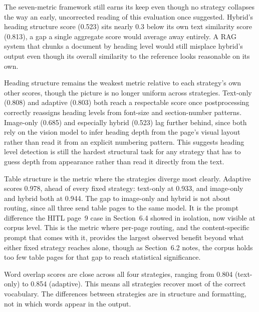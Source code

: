 The seven-metric framework still earns its keep even though no strategy
collapses the way an early, uncorrected reading of this evaluation once
suggested. Hybrid's heading structure score (0.523) sits nearly 0.3 below
its own text similarity score (0.813), a gap a single aggregate score would
average away entirely. A RAG system that chunks a document by heading level
would still misplace hybrid's output even though its overall similarity to
the reference looks reasonable on its own.

Heading structure remains the weakest metric relative to each strategy's
own other scores, though the picture is no longer uniform across
strategies. Text-only (0.808) and adaptive (0.803) both reach a respectable
score once postprocessing correctly reassigns heading levels from
font-size and section-number patterns. Image-only (0.685) and especially
hybrid (0.523) lag further behind, since both rely on the vision model to
infer heading depth from the page's visual layout rather than read it from
an explicit numbering pattern. This suggests heading level detection is
still the hardest structural task for any strategy that has to guess depth
from appearance rather than read it directly from the text.

Table structure is the metric where the strategies diverge most clearly.
Adaptive scores 0.978, ahead of every fixed strategy: text-only at 0.933,
and image-only and hybrid both at 0.944. The gap to image-only and hybrid
is not about routing, since all three send table pages to the same model.
It is the prompt difference the HITL page~9 case in Section~6.4 showed in
isolation, now visible at corpus level. This is the metric where per-page
routing, and the content-specific prompt that comes with it, provides the
largest observed benefit beyond what either fixed strategy reaches alone,
though as Section~6.2 notes, the corpus holds too few table pages for that
gap to reach statistical significance.

Word overlap scores are close across all four strategies, ranging from
0.804 (text-only) to 0.854 (adaptive). This means all strategies recover
most of the correct vocabulary. The differences between strategies are in
structure and formatting, not in which words appear in the output.
